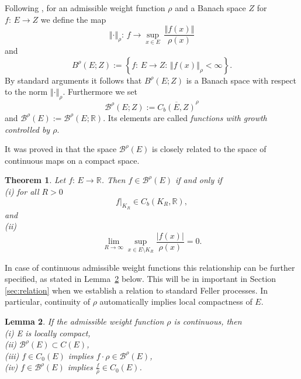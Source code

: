 \documentclass[a4paper,12pt]{article}
\newtheorem{theorem}{Theorem}[section]
\newtheorem{lemma}[theorem]{Lemma}
\theoremstyle{definition}
\theoremstyle{remark}
\numberwithin{equation}{section}
\numberwithin{theorem}{section}
\begin{document}
Following \cite{DoT}, for an admissible
weight function $\rho$ and a Banach space $Z$ for  $f:\,E\rightarrow Z$  we define the map 
\[
\left\Vert \cdot\right\Vert _{\rho}:\,f\rightarrow\underset{x\in E}{\sup}\,\frac{\left\Vert f(x)\right\Vert }{\rho(x)}
\]
and
\[
B^{\rho}(E;Z):=\left\{ f:\,E\rightarrow Z:\,\left\Vert f(x)\right\Vert_{\rho} <\infty\right\} .
\]
By standard arguments it follows that $B^{\rho}(E;Z)$ is a Banach space with respect to the norm $\left\Vert \cdot\right\Vert_{\rho}$. Furthermore we set\[ \mathcal{\mathscr{B}}^{\rho}(E;Z) := \overline{C_{b}\left(E,Z\right)}^{\rho}
\] and $\mathcal{\mathscr{B}}^{\rho}(E) := \mathcal{\mathscr{B}}^{\rho}(E;\mathbb{R})$. Its elements are called \textit{functions with growth controlled by $\rho$}.



It was proved in
\cite{DoT} that the space $\mathcal{\mathscr{B}}^{\rho}(E)$
is closely related to the space of continuous maps on a compact space. 
\begin{theorem}
\label{thm: equivalence B-rho space} Let $f:\,E\rightarrow\mathbb{R}$.
Then $f\in\mathcal{\mathscr{B}}^{\rho}(E)$ if and only if \\
(i) for all $R>0$
\[
\left.f\right|_{K_{R}}\in C_{b}(K_{R},\mathbb{R}),
\]
 and \\
(ii)
\[
\underset{R\rightarrow\infty}{\lim}\underset{x\in E\setminus K_{R}}{\sup}\frac{\left|f(x)\right|}{\rho(x)}=0.
\]
\end{theorem}

In case of continuous admissible weight functions this relationship can be further specified, as stated in Lemma~\ref{lem: continuous weight function B-rho space is continuous } below. This will be in important in Section \ref{sec:relation} when we establish a relation to standard Feller processes. In particular, continuity of $\rho$ automatically implies local compactness of $E$.

\begin{lemma}
\label{lem: continuous weight function B-rho space is continuous }
If the admissible weight function $\rho$ is continuous, then \\
(i) E is locally compact, \\
(ii) $\mathcal{\mathscr{B}}^{\rho}(E)\subset C(E)$,\\
(iii) $f\in C_{0}(E)$ implies $f\cdot\rho\in\mathcal{\mathscr{B}}^{\rho}(E)$,\\
(iv) $f\in\mathcal{\mathscr{B}}^{\rho}(E)$ implies $\frac{f}{\rho}\in C_{0}(E)$.
\end{lemma}
\end{document}
